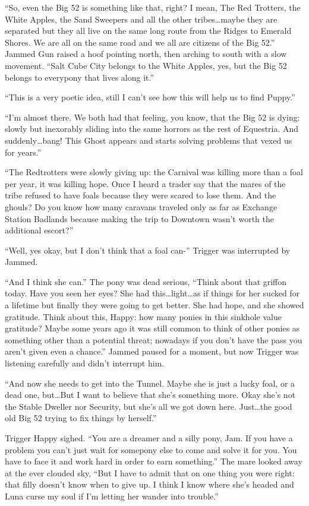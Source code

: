 ``So, even the Big 52 is something like that, right? I mean, The Red Trotters, the White Apples, the Sand Sweepers and all the other tribes\dots maybe they are separated but they all live on the same long route from the Ridges to Emerald Shores. We are all on the same road and we all are citizens of the Big 52.'' Jammed Gun raised a hoof pointing north, then arching to south with a slow movement. ``Salt Cube City belongs to the White Apples, yes, but the Big 52 belongs to everypony that lives along it.''

``This is a very poetic idea, still I can't see how this will help us to find Puppy.''

``I'm almost there. We both had that feeling, you know, that the Big 52 is dying: slowly but inexorably sliding into the same horrors as the rest of Equestria. And suddenly\dots bang! This Ghost appears and starts solving problems that vexed us for years.''

``The Redtrotters were slowly giving up: the Carnival was killing more than a foal per year, it was killing hope. Once I heard a trader say that the mares of the tribe refused to have foals because they were scared to lose them. And the ghouls? Do you know how many caravans traveled only as far as Exchange Station Badlands because making the trip to Downtown wasn't worth the additional escort?''

``Well, yes okay, but I don't think that a foal can-'' Trigger was interrupted by Jammed.

``And I think she can.'' The pony was dead serious, ``Think about that griffon today. Have you seen her eyes? She had this\dots light\dots as if things for her sucked for a lifetime but finally they were going to get better. She had hope, and she showed gratitude. Think about this, Happy: how many ponies in this sinkhole value gratitude? Maybe some years ago it was still common to think of other ponies as something other than a potential threat; nowadays if you don't have the pass you aren't given even a chance.'' Jammed paused for a moment, but now Trigger was listening carefully and didn't interrupt him.

``And now she needs to get into the Tunnel. Maybe she is just a lucky foal, or a dead one, but\dots But I want to believe that she's something more. Okay she's not the Stable Dweller nor Security, but she's all we got down here. Just\dots the good old Big 52 trying to fix things by herself.''

Trigger Happy sighed. ``You are a dreamer and a silly pony, Jam. If you have a problem you can't just wait for somepony else to come and solve it for you. You have to face it and work hard in order to earn something.'' The mare looked away at the ever clouded sky, ``But I have to admit that on one thing you were right: that filly doesn't know when to give up. I think I know where she's headed and Luna curse my soul if I'm letting her wander into trouble.''

